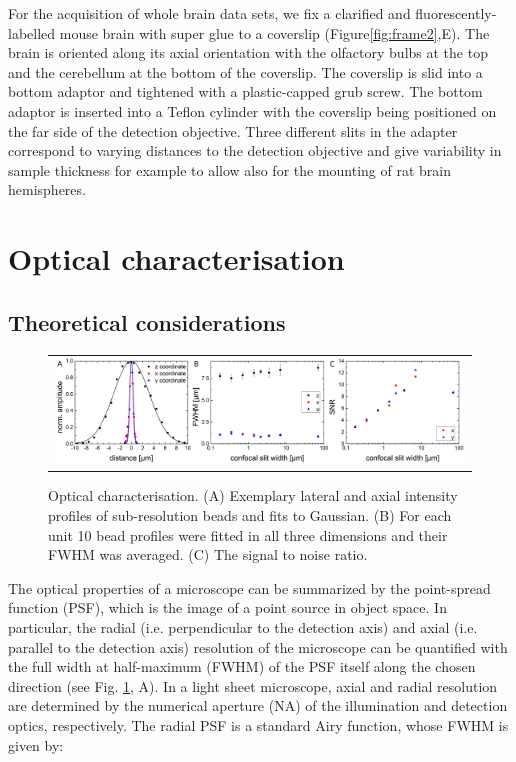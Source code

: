 \documentclass[12pt]{spieman}  %
\begin{document}
For the acquisition of whole brain data sets, we fix a clarified and fluorescently-labelled mouse brain with super glue to a coverslip (Figure\ref{fig:frame2},E). The brain is oriented along its axial orientation with the olfactory bulbs at the top and the cerebellum at the bottom of the coverslip. The coverslip is slid into a bottom adaptor and tightened with a plastic-capped grub screw. The bottom adaptor is inserted into a Teflon cylinder with the coverslip being positioned on the far side of the detection objective. Three different slits in the adapter correspond to varying distances to the detection objective and give variability in sample thickness for example to allow also for the mounting of rat brain hemispheres.
	
\section{Optical characterisation}

\subsection{Theoretical considerations}
\begin{figure}
   \begin{center}
   \begin{tabular}{c}
   \includegraphics[width=\textwidth]{origin.eps}
   \end{tabular}
   \end{center}
   \caption{\label{fig:origin} Optical characterisation. (A) Exemplary lateral and axial intensity profiles of sub-resolution beads and fits to Gaussian. (B) For each unit 10 bead profiles were fitted in all three dimensions and their FWHM was averaged. (C) The signal to noise ratio.} 
\end{figure}

The optical properties of a microscope can be summarized by the point-spread function (PSF), which is the image of a point source in object space. In particular, the radial (i.e. perpendicular to the detection axis) and axial (i.e. parallel to the detection axis) resolution of the microscope can be quantified with the full width at half-maximum (FWHM) of the PSF itself along the chosen direction (see Fig. \ref{fig:origin}, A). In a light sheet microscope, axial and radial resolution are determined by the numerical aperture (NA) of the illumination and detection optics, respectively. The radial PSF is a standard Airy function, whose FWHM is given by:
\end{document}

